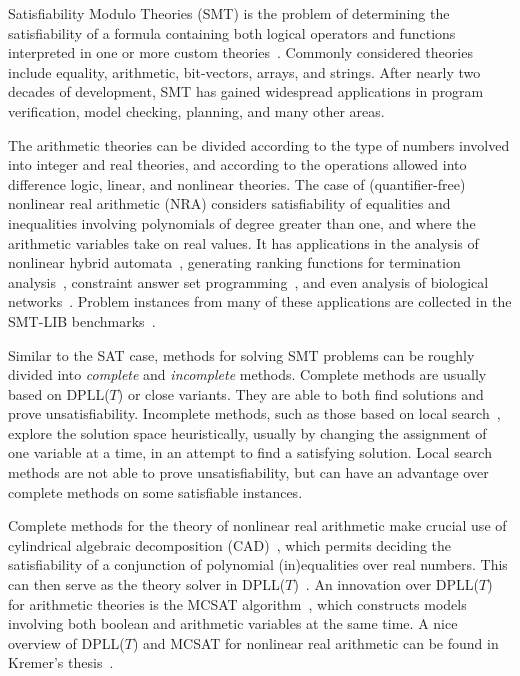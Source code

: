 \documentclass[runningheads]{llncs}
\begin{document}
Satisfiability Modulo Theories (SMT) is the problem of determining the satisfiability of a formula containing both logical operators and functions interpreted in one or more custom theories~\cite{BarrettT18}. Commonly considered theories include equality, arithmetic, bit-vectors, arrays, and strings. After nearly two decades of development, SMT has gained widespread applications in program verification, model checking, planning, and many other areas.

The arithmetic theories can be divided according to the type of numbers involved into integer and real theories, and according to the operations allowed into difference logic, linear, and nonlinear theories. The case of (quantifier-free) nonlinear real arithmetic (NRA) considers satisfiability of equalities and inequalities involving polynomials of degree greater than one, and where the arithmetic variables take on real values. It has applications in the analysis of nonlinear hybrid automata~\cite{CimattiMT12}, generating ranking functions for termination analysis~\cite{HeizmannHLP13,LeikeH15}, constraint answer set programming~\cite{SusmanL16,ShenL18}, and even analysis of biological networks~\cite{AkutsuHT08}. Problem instances from many of these applications are collected in the SMT-LIB benchmarks~\cite{BarFT-SMTLIB}.

Similar to the SAT case, methods for solving SMT problems can be roughly divided into \emph{complete} and \emph{incomplete} methods. Complete methods are usually based on DPLL($T$) or close variants. They are able to both find solutions and prove unsatisfiability. Incomplete methods, such as those based on local search~\cite{HoosS2004}, explore the solution space heuristically, usually by changing the assignment of one variable at a time, in an attempt to find a satisfying solution. Local search methods are not able to prove unsatisfiability, but can have an advantage over complete methods on some satisfiable instances.

Complete methods for the theory of nonlinear real arithmetic make crucial use of cylindrical algebraic decomposition (CAD)~\cite{Caviness2004QuantifierEA}, which permits deciding the satisfiability of a conjunction of polynomial (in)equalities over real numbers. This can then serve as the theory solver in DPLL($T$)~\cite{NieuwenhuisOT06}. An innovation over DPLL($T$) for arithmetic theories is the MCSAT algorithm~\cite{JovanovicM12,MouraJ13}, which constructs models involving both boolean and arithmetic variables at the same time. A nice overview of DPLL($T$) and MCSAT for nonlinear real arithmetic can be found in Kremer's thesis~\cite{Kremer20}.
\end{document}
